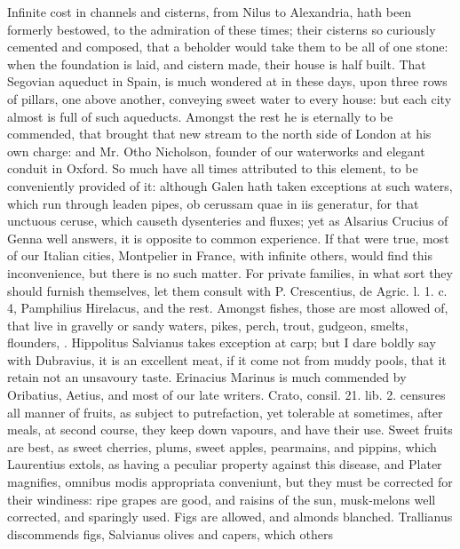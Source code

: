{Infinite cost in channels and cisterns, from Nilus to Alexandria, hath
been formerly bestowed, to the admiration of these times; their
cisterns so curiously cemented and composed, that a beholder would take
them to be all of one stone: when the foundation is laid, and cistern
made, their house is half built. That Segovian aqueduct in Spain, is
much wondered at in these days, upon three rows of pillars, one
above another, conveying sweet water to every house: but each city
almost is full of such aqueducts. Amongst the rest he is
eternally to be commended, that brought that new stream to the north
side of London at his own charge: and Mr. Otho Nicholson, founder of
our waterworks and elegant conduit in Oxford. So much have all times
attributed to this element, to be conveniently provided of it: although
Galen hath taken exceptions at such waters, which run through leaden
pipes, ob cerussam quae in iis generatur, for that unctuous ceruse,
which causeth dysenteries and fluxes; yet as Alsarius Crucius of
Genna well answers, it is opposite to common experience. If that were
true, most of our Italian cities, Montpelier in France, with infinite
others, would find this inconvenience, but there is no such matter. For
private families, in what sort they should furnish themselves, let them
consult with P. Crescentius, de Agric. l. 1. c. 4, Pamphilius
Hirelacus, and the rest.
Amongst fishes, those are most allowed of, that live in gravelly or
sandy waters, pikes, perch, trout, gudgeon, smelts, flounders, \etc{}.
Hippolitus Salvianus takes exception at carp; but I dare boldly say
with  Dubravius, it is an excellent meat, if it come not from
muddy pools, that it retain not an unsavoury taste. Erinacius
Marinus is much commended by Oribatius, Aetius, and most of our late
writers.
Crato, consil. 21. lib. 2. censures all manner of fruits, as
subject to putrefaction, yet tolerable at sometimes, after meals, at
second course, they keep down vapours, and have their use. Sweet fruits
are best, as sweet cherries, plums, sweet apples, pearmains, and
pippins, which Laurentius extols, as having a peculiar property against
this disease, and Plater magnifies, omnibus modis appropriata
conveniunt, but they must be corrected for their windiness: ripe grapes
are good, and raisins of the sun, musk-melons well corrected, and
sparingly used. Figs are allowed, and almonds blanched. Trallianus
discommends figs, Salvianus olives and capers, which others
}
